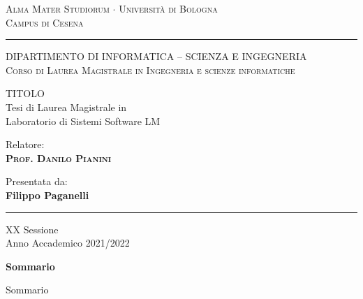 \documentclass[12pt,a4paper]{report}
\begin{document}
\lstset{language=C, numbers = left}
\begin{titlepage}
\begin{center}
{{\Large{\textsc{Alma Mater Studiorum $\cdot$ Universit\`a di
Bologna\\\vspace{2mm}Campus di Cesena}}}} \rule[0.1cm]{15.8cm}{0.2mm}

{\small{\textsc { DIPARTIMENTO DI INFORMATICA – SCIENZA E INGEGNERIA \\
\vspace{3mm}
Corso di Laurea Magistrale in Ingegneria e scienze informatiche}}}
\end{center}
\vspace{15mm}
\begin{center}
TITOLO
\vspace{20mm} {\large{\sc \\Tesi di Laurea Magistrale in\\ Laboratorio di Sistemi Software LM}}
\end{center}
\vfill
\par
\noindent
\begin{minipage}[t]{0.47\textwidth}
{\large{\sc Relatore:}\\
{\bf \textsc{Prof. Danilo Pianini}}}\\
\vskip 8pt
\end{minipage}
\hfill
\begin{minipage}[t]{0.47\textwidth}\raggedleft
{\large{\sc Presentata da:}\\
{\bf Filippo Paganelli}}
\end{minipage}
\vspace{20mm}
\begin{center}
\rule[0.1cm]{15.8cm}{0.2mm}
{\large{\sc XX Sessione\\
Anno Accademico 2021/2022}}
\end{center}
\end{titlepage}

\newpage

\begin{center}
{\LARGE{\bf Sommario}}
\end{center}
{
\justify
\noindent
Sommario
}

\newpage

\tableofcontents


\end{document}
